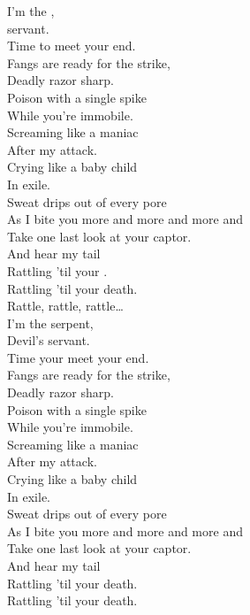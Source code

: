I'm the , \\
 servant. \\
Time to meet your end. \\

Fangs are ready for the strike, \\
Deadly razor sharp. \\
Poison with a single spike \\
While you're immobile. \\

Screaming like a maniac \\
After my attack. \\
Crying like a baby child \\
In exile. \\

Sweat drips out of every pore \\
As I bite you more and more and more and \\
Take one last look at your captor. \\
And hear my tail \\
Rattling 'til your . \\
Rattling 'til your death. \\

Rattle, rattle, rattle… \\

I'm the serpent, \\
Devil's servant. \\
Time your meet your end. \\

Fangs are ready for the strike, \\
Deadly razor sharp. \\
Poison with a single spike \\
While you're immobile. \\

Screaming like a maniac \\
After my attack. \\
Crying like a baby child \\
In exile. \\

Sweat drips out of every pore \\
As I bite you more and more and more and \\
Take one last look at your captor. \\
And hear my tail \\
Rattling 'til your death. \\
Rattling 'til your death. \\

